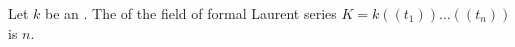 \begin{theorem} \label{theorem:field_of_formal_laurent_series_over_algebraically_closed_field_has_cohomological_dimension_equal_to_number_of_variables}
Let $k$ be an . The  of the field of formal Laurent series $K = k((t_1))\dots((t_n))$ is $n$.
\end{theorem}